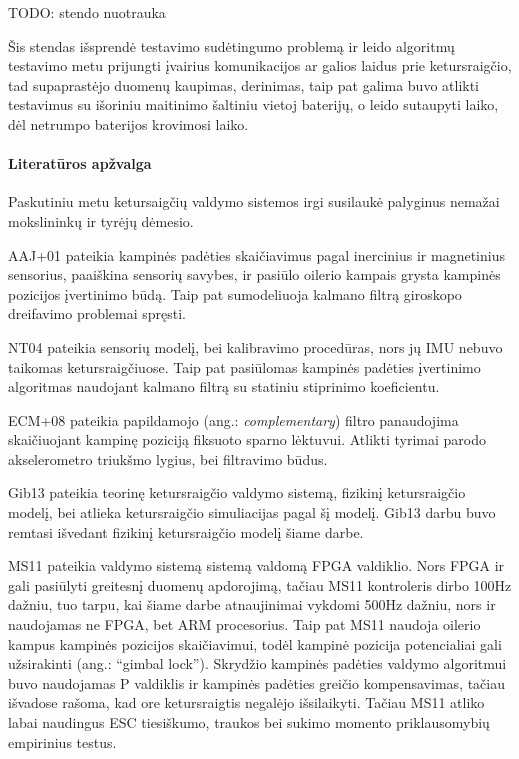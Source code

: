 \documentclass[12pt, a4paper, lithuanian, final]{article}
\begin{document}
TODO: stendo nuotrauka
\vspace{5cm}


Šis stendas išsprendė testavimo sudėtingumo problemą ir leido algoritmų testavimo metu prijungti įvairius komunikacijos ar galios laidus prie ketursraigčio, tad supaprastėjo duomenų kaupimas, derinimas, taip pat galima buvo atlikti testavimus su išoriniu maitinimo šaltiniu vietoj baterijų, o leido sutaupyti laiko, dėl netrumpo baterijos krovimosi laiko.




\paragraph{Literatūros apžvalga}

Paskutiniu metu ketursaigčių valdymo sistemos irgi susilaukė palyginus nemažai mokslininkų ir tyrėjų dėmesio.

AAJ+01 pateikia kampinės padėties skaičiavimus pagal inercinius ir magnetinius sensorius, paaiškina sensorių savybes, ir pasiūlo oilerio kampais grysta kampinės pozicijos įvertinimo būdą.
Taip pat sumodeliuoja kalmano filtrą giroskopo dreifavimo problemai spręsti.


NT04 pateikia sensorių modelį, bei kalibravimo procedūras, nors jų IMU nebuvo taikomas ketursraigčiuose.
Taip pat pasiūlomas kampinės padėties įvertinimo algoritmas naudojant kalmano filtrą su statiniu stiprinimo koeficientu.

ECM+08 pateikia papildamojo (ang.: \textit{complementary}) filtro panaudojima skaičiuojant kampinę poziciją fiksuoto sparno lėktuvui.
Atlikti tyrimai parodo akselerometro triukšmo lygius, bei filtravimo būdus.

Gib13 pateikia teorinę ketursraigčio valdymo sistemą, fizikinį ketursraigčio modelį, bei atlieka ketursraigčio simuliacijas pagal šį modelį.
Gib13 darbu buvo remtasi išvedant fizikinį ketursraigčio modelį šiame darbe.

MS11 pateikia valdymo sistemą sistemą valdomą FPGA valdiklio.
Nors FPGA ir gali pasiūlyti greitesnį duomenų apdorojimą, tačiau MS11 kontroleris dirbo 100Hz dažniu, tuo tarpu, kai šiame darbe atnaujinimai vykdomi 500Hz dažniu, nors ir naudojamas ne FPGA, bet ARM procesorius.
Taip pat MS11 naudoja oilerio kampus kampinės pozicijos skaičiavimui, todėl kampinė pozicija potencialiai gali užsirakinti (ang.: "`gimbal lock"').
Skrydžio kampinės padėties valdymo algoritmui buvo naudojamas P valdiklis ir kampinės padėties greičio kompensavimas, tačiau išvadose rašoma, kad ore ketursraigtis negalėjo išsilaikyti.
Tačiau MS11 atliko labai naudingus ESC tiesiškumo, traukos bei sukimo momento priklausomybių empirinius testus.
\end{document}
